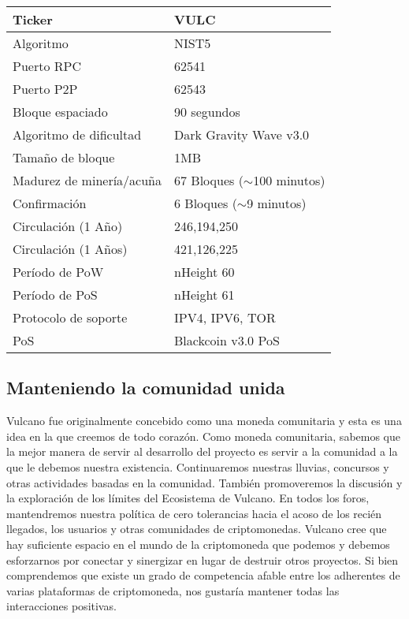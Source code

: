 \documentclass[A4paper, 12pt]{article}
\begin{document}
\begin{table}[h]
\centering
\begin{tabular}{@{}ll@{}}
\toprule
Ticker & VULC \\ \midrule
Algoritmo & NIST5 \\
Puerto RPC & 62541 \\
Puerto P2P & 62543 \\
Bloque espaciado & 90 segundos \\
Algoritmo de dificultad & Dark Gravity Wave v3.0 \\
Tamaño de bloque & 1MB \\
Madurez de minería/acuña & 67 Bloques ($\sim$100 minutos) \\
Confirmación & 6 Bloques ($\sim$9 minutos) \\
Circulación (1 Año) & 246,194,250 \\
Circulación (1 Años) & 421,126,225 \\
Período de PoW & nHeight 60 \\
Período de PoS & nHeight 61 \\
Protocolo de soporte & IPV4, IPV6, TOR \\
PoS & Blackcoin v3.0 PoS \\ \bottomrule
\end{tabular}
\end{table}

\subsection{Manteniendo la comunidad unida}
Vulcano fue originalmente concebido como una moneda comunitaria y esta es una idea en la que creemos de todo corazón.  Como moneda comunitaria, sabemos que la mejor manera de servir al desarrollo del proyecto es servir a la comunidad a la que le debemos nuestra existencia. Continuaremos nuestras lluvias, concursos y otras actividades basadas en la comunidad. También promoveremos la discusión y la exploración de los límites del Ecosistema de Vulcano.  En todos los foros, mantendremos nuestra política de cero tolerancias hacia el acoso de los recién llegados, los usuarios y otras comunidades de criptomonedas. Vulcano cree que hay suficiente espacio en el mundo de la criptomoneda que podemos y debemos esforzarnos por conectar y sinergizar en lugar de destruir otros proyectos. Si bien comprendemos que existe un grado de competencia afable entre los adherentes de varias plataformas de criptomoneda, nos gustaría mantener todas las interacciones positivas.
\end{document}
